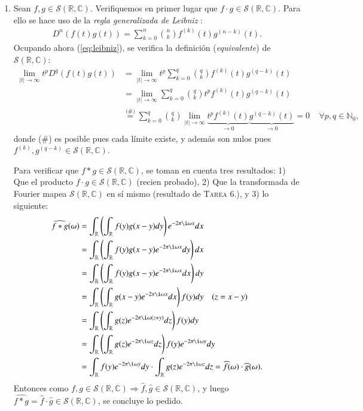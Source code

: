 \documentclass[spanish, fleqn]{article}
\begin{document}
\begin{description}
\begin{enumerate}
		\item Sean $f,g  \in \mathcal{S}(\mathbb{R},\mathbb{C})$. Verifiquemos en primer lugar que $f\cdot g \in \mathcal{S}(\mathbb{R},\mathbb{C})$. Para ello se hace uso de la \textit{regla generalizada de Leibniz} \cite{Leibniz}:
		\begin{align}
			D^n \left(f(t)g(t) \right) = \sum_{k=0}^n {n \choose k} f^{(k)}(t) g^{(n-k)}(t).
		\label{eq:leibniz}
		\end{align}
		Ocupando ahora (\ref{eq:leibniz}), se verifica la definición (\textit{equivalente}) de $\mathcal{S}(\mathbb{R},\mathbb{C})$:
		\begin{align*}
			\lim_{|t|\rightarrow \infty} t^p D^q \left( f(t)g(t) \right)
			&= \lim_{|t|\rightarrow \infty} t^p \sum_{k=0}^q {q \choose k} f^{(k)}(t) g^{(q-k)}(t) \\
			&= \lim_{|t|\rightarrow \infty} \sum_{k=0}^q {q \choose k} t^p f^{(k)}(t) g^{(q-k)}(t) \\
			&\stackrel{\text{(\#)}}{=} \sum_{k=0}^q {q \choose k}\lim_{|t|\rightarrow \infty}  \underbrace{t^p f^{(k)}(t)}_{\rightarrow 0} \underbrace{g^{(q-k)}(t)}_{\rightarrow 0} = 0 \ \ \ \ \ \forall p,q \in \mathbb{N}_0,
		\end{align*}
		donde (\#) es posible pues cada límite existe, y además son nulos pues $f^{(k)},g^{(q-k)} \in \mathcal{S}(\mathbb{R},\mathbb{C})$.

		Para verificar que $f * g \in \mathcal{S}(\mathbb{R},\mathbb{C})$, se toman en cuenta tres resultados: 1) Que el producto $f \cdot g \in \mathcal{S}(\mathbb{R},\mathbb{C})$ (recien probado), 2) Que la transformada de Fourier mapea $\mathcal{S}(\mathbb{R},\mathbb{C})$ en sí mismo (resultado de \textsc{Tarea 6.}), y 3) lo siguiente:
		\begin{align*}
			\widehat{f * g}(\omega) &= \int_{\mathbb{R}} \left( \int_{\mathbb{R}} f(y) g(x-y) dy \right) e^{-2 \pi \i \omega x} dx \\
			&= \int_{\mathbb{R}} \left( \int_{\mathbb{R}} f(y) g(x-y) e^{-2 \pi \i \omega x} dy \right) dx \\
			&=  \int_{\mathbb{R}} \left( \int_{\mathbb{R}} f(y) g(x-y) e^{-2 \pi \i \omega x} dx \right) dy \\
			&= \int_{\mathbb{R}} \left( \int_{\mathbb{R}} g(x-y) e^{-2 \pi \i \omega x} dx \right) f(y) dy \ \ \ \ (z = x-y) \\
			&= \int_{\mathbb{R}} \left( \int_{\mathbb{R}} g(z) e^{-2 \pi \i \omega (z+y)} dz \right) f(y) dy \\
			&= \int_{\mathbb{R}} \left( \int_{\mathbb{R}} g(z) e^{-2 \pi \i \omega z} dz \right) f(y) e^{-2 \pi \i \omega y} dy \\
			&= \int_{\mathbb{R}} f(y) e^{-2 \pi \i \omega y} dy \cdot \int_{\mathbb{R}} g(z) e^{-2 \pi \i \omega z} dz = \widehat{f}(\omega) \cdot \widehat{g}(\omega).
		\end{align*}
		Entonces como $f,g \in  \mathcal{S}(\mathbb{R},\mathbb{C}) \Rightarrow \widehat{f},\widehat{g} \in  \mathcal{S}(\mathbb{R},\mathbb{C})$, y luego $\widehat{f * g} = \widehat{f}\cdot \widehat{g} \in  \mathcal{S}(\mathbb{R},\mathbb{C})$, se concluye lo pedido.


\end{enumerate}
\end{description}
\end{document}
